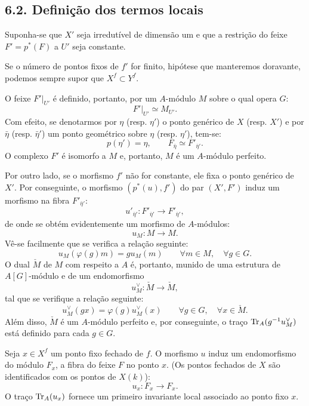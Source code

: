 \subsection*{6.2. Definição dos termos locais}
Suponha-se que $X'$ seja irredutível de dimensão um e que a restrição do feixe $F'=p^*(F)$ a $U'$ seja constante.

Se o número de pontos fixos de $f'$ for finito, hipótese que manteremos doravante, podemos sempre supor que $X^f \subset Y^f$.

O feixe $F'|_{U'}$ é definido, portanto, por um $A$-módulo $M$ sobre o qual opera $G$:
\[
F'|_{U'} \simeq M_{U'} .
\]
Com efeito, se denotarmos por $\eta$ (resp. $\eta'$) o ponto genérico de $X$ (resp. $X'$) e por $\bar\eta$ (resp. $\bar\eta'$) um ponto geométrico sobre $\eta$ (resp. $\eta'$), tem-se:
\[
p(\eta')=\eta,\qquad F_{\bar\eta} \simeq F'_{\bar\eta'} .
\]
O complexo $F'$ é isomorfo a $M$ e, portanto, $M$ é um $A$-módulo perfeito.

Por outro lado, se o morfismo $f'$ não for constante, ele fixa o ponto genérico de $X'$. Por conseguinte, o morfismo $(p^*(u),f')$ do par $(X',F')$ induz um morfismo na fibra $F'_{\bar\eta'}$:
\[
u'_{\bar\eta'}:F'_{\bar\eta'}\longrightarrow F'_{\bar\eta'} ,
\]
de onde se obtém evidentemente um morfismo de $A$-módulos:
\[
u_M:M\longrightarrow M .
\]
Vê-se facilmente que se verifica a relação seguinte:
\begin{equation}\tag{6.2.1}
u_M(\varphi(g)m)=g u_M(m) \qquad \forall m\in M,\quad \forall g\in G .
\end{equation}
O dual $\check M$ de $M$ com respeito a $A$ é, portanto, munido de uma estrutura de $A[G]$-módulo e de um endomorfismo
\[
u_M^\vee:\check M\longrightarrow \check M ,
\]
tal que se verifique a relação seguinte:
\[
u_M^\vee(gx)=\varphi(g)u_M^\vee(x) \qquad \forall g\in G,\quad \forall x\in \check M .
\]
Além disso, $\check M$ é um $A$-módulo perfeito e, por conseguinte, o traço $\operatorname{Tr}_A(g^{-1}u_M^\vee)$ está definido para cada $g\in G$.

Seja $x\in X^f$ um ponto fixo fechado de $f$. O morfismo $u$ induz um endomorfismo do módulo $F_x$, a fibra do feixe $F$ no ponto $x$. (Os pontos fechados de $X$ são identificados com os pontos de $X(k)$):
\[
u_x:F_x\longrightarrow F_x .
\]
O traço $\operatorname{Tr}_A(u_x)$ fornece um primeiro invariante local associado ao ponto fixo $x$.

